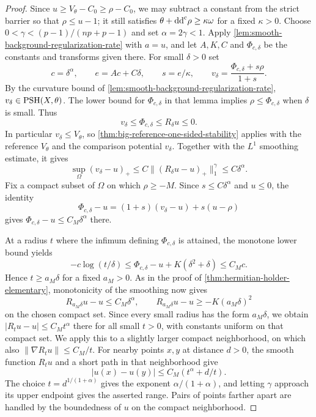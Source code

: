 \begin{proof}
Since $u\geq V_\theta-C_0\geq\rho-C_0$, we may subtract a constant from the strict barrier so that $\rho\leq u-1$; it still satisfies $\theta+\mathrm{dd}^{\mathrm{c}}\rho\geq\kappa\omega$ for a fixed $\kappa>0$. Choose $0<\gamma<(p-1)/(np+p-1)$ and set $\alpha=2\gamma<1$. Apply \cref{lem:smooth-background-regularization-rate} with $a=u$, and let $A,K,C$ and $\Phi_{c,\delta}$ be the constants and transforms given there. For small $\delta>0$ set
\[
 c=\delta^\alpha,\qquad e=Ac+C\delta,\qquad s=e/\kappa,
 \qquad v_\delta=\frac{\Phi_{c,\delta}+s\rho}{1+s}.
\]
By the curvature bound of \cref{lem:smooth-background-regularization-rate}, $v_\delta\in\mathrm{PSH}(X,\theta)$. The lower bound for $\Phi_{c,\delta}$ in that lemma implies $\rho\leq\Phi_{c,\delta}$ when $\delta$ is small. Thus
\[
 v_\delta\leq\Phi_{c,\delta}\leq R_\delta u\leq0.
\]
In particular $v_\delta\leq V_\theta$, so \cref{thm:big-reference-one-sided-stability} applies with the reference $V_\theta$ and the comparison potential $v_\delta$. Together with the $L^1$ smoothing estimate, it gives
\[
 \sup_\Omega(v_\delta-u)_+
 \leq C\|(R_\delta u-u)_+\|_1^\gamma\leq C\delta^\alpha.
\]
Fix a compact subset of $\Omega$ on which $\rho\geq-M$. Since $s\leq C\delta^\alpha$ and $u\leq0$, the identity
\[
 \Phi_{c,\delta}-u=(1+s)(v_\delta-u)+s(u-\rho)
\]
gives $\Phi_{c,\delta}-u\leq C_M\delta^\alpha$ there.

At a radius $t$ where the infimum defining $\Phi_{c,\delta}$ is attained, the monotone lower bound yields
\[
 -c\log(t/\delta)\leq\Phi_{c,\delta}-u+K(\delta^2+\delta)
 \leq C_Mc.
\]
Hence $t\geq a_M\delta$ for a fixed $a_M>0$. As in the proof of \cref{thm:hermitian-holder-elementary}, monotonicity of the smoothing now gives
\[
 R_{a_M\delta}u-u\leq C_M\delta^\alpha,
 \qquad R_{a_M\delta}u-u\geq-K(a_M\delta)^2
\]
on the chosen compact set. Since every small radius has the form $a_M\delta$, we obtain $|R_tu-u|\leq C_Mt^\alpha$ there for all small $t>0$, with constants uniform on that compact set.
We apply this to a slightly larger compact neighborhood, on which also $\|\nabla R_tu\|\leq C_M/t$. For nearby points $x,y$ at distance $d>0$, the smooth function $R_tu$ and a short path in that neighborhood give
\[
 |u(x)-u(y)|\leq C_M(t^\alpha+d/t).
\]
The choice $t=d^{1/(1+\alpha)}$ gives the exponent $\alpha/(1+\alpha)$, and letting $\gamma$ approach its upper endpoint gives the asserted range. Pairs of points farther apart are handled by the boundedness of $u$ on the compact neighborhood.
\end{proof}

